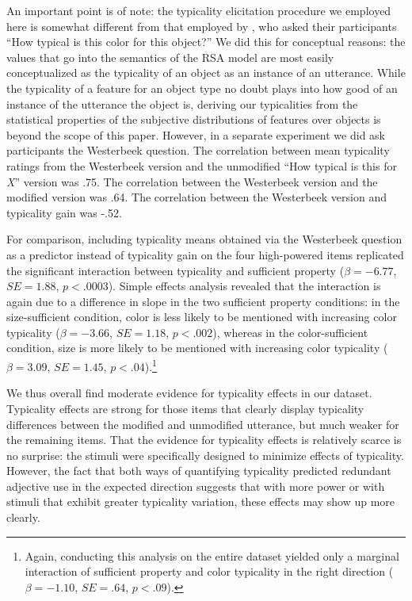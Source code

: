 \documentclass[11pt]{article}
\begin{document}
 An important point is of note: the typicality elicitation procedure we employed here is somewhat different from that employed by , who asked their participants ``How typical is this color for this object?'' We did this for conceptual reasons: the values that go into the semantics of the RSA model are most easily conceptualized as the typicality of an object as an instance of an utterance. While the typicality of a feature for an object type no doubt plays into how good of an instance of the utterance the object is, deriving our typicalities from the  statistical properties of the subjective distributions of features over objects is beyond the scope of this paper. However, in a separate experiment we did ask participants the Westerbeek question. The correlation between mean typicality ratings from the Westerbeek version and the unmodified ``How typical is this for \emph{X}'' version was .75. The correlation between the Westerbeek version and the modified version was .64. The correlation between the Westerbeek version and typicality gain was -.52.

For comparison, including typicality means obtained via the Westerbeek question as a predictor instead of typicality gain on the four high-powered items replicated the significant interaction between typicality and sufficient property ($\beta = -6.77$, $SE = 1.88$, $p < .0003$). Simple effects analysis revealed that the interaction is again due to a difference in slope in the two sufficient property conditions: in the size-sufficient condition, color is less likely to be mentioned with increasing color typicality   ($\beta = -3.66$, $SE = 1.18$, $p < .002$), whereas in the color-sufficient condition, size is more likely to be mentioned with increasing color typicality ($\beta = 3.09$, $SE = 1.45$, $p < .04$).\footnote{Again, conducting this analysis on the entire dataset yielded only a marginal interaction of sufficient property and color typicality in the right direction ($\beta = -1.10$, $SE = .64$, $p < .09$).}

We thus overall find moderate evidence for typicality effects in our dataset. Typicality effects are strong for those items that clearly display typicality differences between the modified and unmodified utterance, but much weaker for the remaining items. That the evidence for typicality effects is relatively scarce is no surprise: the stimuli were specifically designed to minimize effects of typicality. However, the fact that both ways of quantifying typicality predicted redundant adjective use in the expected direction suggests that with more power or with stimuli that exhibit greater typicality variation, these effects may show up more clearly.
\end{document}
